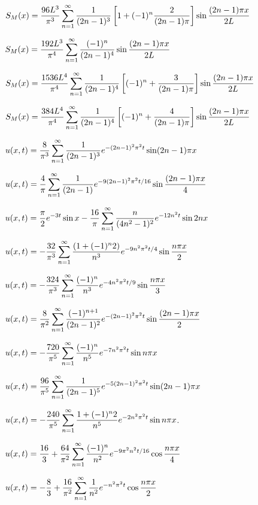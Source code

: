 $S_M(x)
=\displaystyle\frac{96L^3}{\pi^3}\sum_{n=1}^\infty
\frac{1}{(2n-1)^3}\left[1+(-1)^n\frac{2}{(2n-1)\pi}\right]\sin\frac{(2n-1)\pi
x}{2L}$

$S_M(x)=\displaystyle\frac{192L^3}{\pi^4}\sum_{n=1}^\infty\frac{(-1)^n}{(2n-1)^4}
\sin\frac{(2n-1)\pi x}{2L}$

$S_M(x)=\displaystyle\frac{1536L^4}{\pi^4}\sum_{n=1}^\infty\frac{1}{(2n-1)^4}
\left[(-1)^n+\frac{3}{(2n-1)\pi}\right]\sin\frac{(2n-1)\pi x}{2L}$

$S_M(x)=\displaystyle\frac{384L^4}{\pi^4}\sum_{n=1}^\infty\frac{1}{(2n-1)^4}
\left[(-1)^n+\frac{4}{(2n-1)\pi}\right]\sin\frac{(2n-1)\pi x}{2L}$



$u(x,t)=\displaystyle\frac{8}{\pi^3}\sum_{n=1}^\infty
\frac{1}{(2n-1)^3}
e^{-(2n-1)^2\pi^2t}\sin(2n-1)\pi x$

$u(x,t)=\displaystyle\frac{4}{\pi}\sum_{n=1}^\infty\frac{1}{(2n-1)}
e^{-9(2n-1)^2\pi^2t/16}\sin\frac{(2n-1)\pi x}{4}$


$u(x,t)=\displaystyle\frac{\pi}{2}e^{-3t}\sin
x-\frac{16}{\pi}\sum_{n=1}^\infty\frac{n}{(4n^2-1)^2}e^{-12n^2t}\sin2nx$


$u(x,t)=\displaystyle-\frac{32}{\pi^3}\sum_{n=1}^\infty
\frac{(1+(-1)^n2)}{n^3}
e^{-9n^2\pi^2t/4}\sin\frac{n\pi x}{2}$

$u(x,t)=\displaystyle-\frac{324}{\pi^3}\sum_{n=1}^\infty\frac{(-1)^n}{n^3}
e^{-4n^2\pi^2t/9}\sin\frac{n\pi x}{3}$

$u(x,t)=\displaystyle\frac{8}{\pi^2}\sum_{n=1}^\infty\frac{(-1)^{n+1}}{(2n-1)^2}
e^{-(2n-1)^2\pi^2t}\sin\frac{(2n-1)\pi x}{2}$


$u(x,t)=\displaystyle-\frac{720}{\pi^5}\sum_{n=1}^\infty\frac{(-1)^n}{n^5}e^{-7n^2\pi^2t}\sin n\pi x$

$u(x,t)=\displaystyle\frac{96}{\pi^5}\sum_{n=1}^\infty\frac{1}{(2n-1)^5}
e^{-5(2n-1)^2\pi^2t}\sin(2n-1)\pi x$


$u(x,t)=\displaystyle-\frac{240}{\pi^5}\sum_{n=1}^\infty\frac{1+(-1)^n2}{n^5}e^{-2n^2\pi^2t}\sin n\pi x$.

$u(x,t)=\displaystyle\frac{16}{3}+\frac{64}{\pi^2}\sum_{n=1}^\infty\frac{(-1)^n}{n^2} e^{-9\pi^2n^2t/16}\cos\frac{n\pi x}{4}$

$u(x,t)=\displaystyle-\frac{8}{3}+\frac{16}{\pi^2}\sum_{n=1}^\infty\frac{1}{n^2}e^{-n^2\pi^2t}\cos\frac{n\pi x}{2}$

